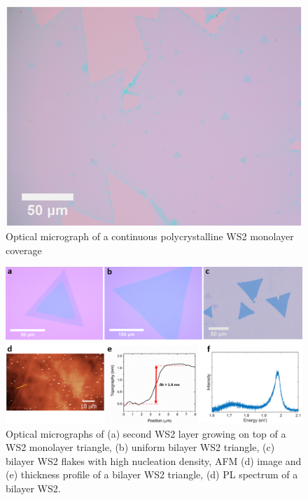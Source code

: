 \documentclass[12pt]{article}
\begin{document}
\begin{figure}[h]
\begin{center}
\includegraphics[scale=0.3]{PaperSIOpticalContinous.png}
\caption{Optical micrograph of a continuous polycrystalline WS2 monolayer coverage}
\label{fig:PaperSIOpticalContinous}
\end{center}
\end{figure}

\begin{figure}[h]
\begin{center}
\includegraphics[scale=0.3]{PaperSIOpticalAFM.png}
\caption{Optical micrographs of (a) second WS2 layer growing on top of a WS2 monolayer triangle, (b) uniform bilayer WS2 triangle, (c) bilayer WS2 flakes with high nucleation density, AFM (d) image and (e) thickness profile of a bilayer WS2 triangle, (d) PL spectrum of a bilayer WS2.}
\label{fig:PaperSIOpticalAFM}
\end{center}
\end{figure}
\end{document}
